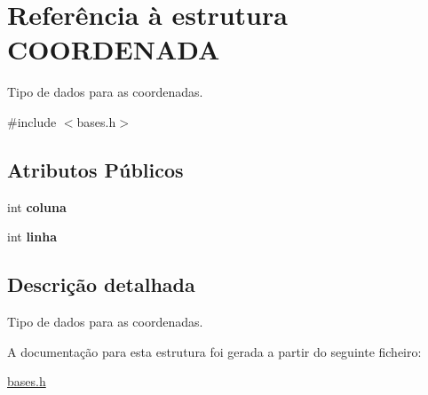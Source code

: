 \hypertarget{structCOORDENADA}{}\section{Referência à estrutura C\+O\+O\+R\+D\+E\+N\+A\+DA}
\label{structCOORDENADA}


Tipo de dados para as coordenadas.  




{\ttfamily \#include $<$bases.\+h$>$}

\subsection*{Atributos Públicos}
\begin{DoxyCompactItemize}
\item 
\mbox{\label{structCOORDENADA_adfbc8d4856ce807139fdf62e00aed29a}} 
int {\bfseries coluna}
\item 
\mbox{\label{structCOORDENADA_aefe14bcc5a066ac3b21500cc3d28c06f}} 
int {\bfseries linha}
\end{DoxyCompactItemize}


\subsection{Descrição detalhada}
Tipo de dados para as coordenadas. 

A documentação para esta estrutura foi gerada a partir do seguinte ficheiro\+:\begin{DoxyCompactItemize}
\item 
\hyperlink{bases_8h}{bases.\+h}\end{DoxyCompactItemize}
